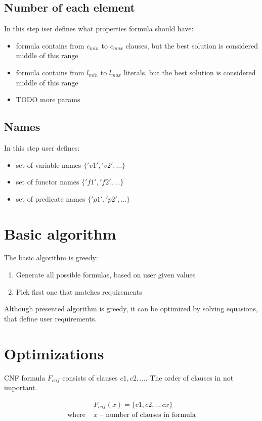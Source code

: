 \subsection{Number of each element}
In this step iser defines what properties formula should have:
\begin{itemize}
	\item formula contains from $c_{min}$ to $c_{max}$ clauses, but the best solution is considered middle of this range
	\item formula contains from $l_{min}$ to $l_{max}$ literals, but the best solution is considered middle of this range
	\item TODO more params
\end{itemize}

\subsection{Names}
In this step user defines:
\begin{itemize}
	\item set of variable names $\{'v1','v2',\dots\}$
	\item set of functor names $\{'f1','f2',\dots\}$
	\item set of predicate names $\{'p1','p2',\dots\}$
\end{itemize}


\section{Basic algorithm}

The basic algorithm is greedy:
\begin{enumerate}
	\item Generate all possible formulas, based on user given values
	\item Pick first one that matches requirements
\end{enumerate}

Although presented algorithm is greedy, it can be optimized by solving equasions, that define user requirements.

\section{Optimizations}

CNF formula $F_{cnf}$ consists of clauses $c1, c2, \dots$. The order of clauses in not important.

\begin{align*}
	&F_{cnf}(x) = \{c1, c2, \dots\, cx\} \\
	\text{where }
		&x \text{ -- number of clauses in formula}
\end{align*}

